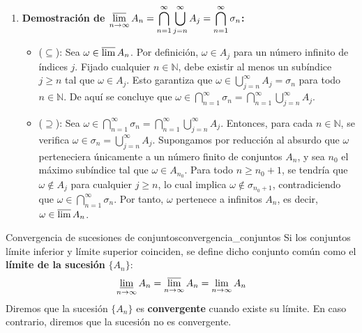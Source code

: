 \begin{demostracion}
\begin{enumerate}[label=\alph*)]
    \item \textbf{Demostración de $\displaystyle \varlimsup_{n \to \infty} A_n = \bigcap_{n=1}^\infty \bigcup_{j=n}^\infty A_j = \bigcap_{n=1}^\infty \sigma_n$:}
    \begin{itemize}
        \item ($\subseteq$): Sea $\omega \in \varlimsup A_n$. Por definición, $\omega \in A_j$ para un número infinito de índices $j$. Fijado cualquier $n \in \mathbb{N}$, debe existir al menos un subíndice $j \ge n$ tal que $\omega \in A_j$. Esto garantiza que $\omega \in \bigcup_{j=n}^\infty A_j = \sigma_n$ para todo $n \in \mathbb{N}$. De aquí se concluye que $\omega \in \bigcap_{n=1}^\infty \sigma_n = \bigcap_{n=1}^\infty \bigcup_{j=n}^\infty A_j$.
        \item ($\supseteq$): Sea $\omega \in \bigcap_{n=1}^\infty \sigma_n = \bigcap_{n=1}^\infty \bigcup_{j=n}^\infty A_j$. Entonces, para cada $n \in \mathbb{N}$, se verifica $\omega \in \sigma_n = \bigcup_{j=n}^\infty A_j$. Supongamos por reducción al absurdo que $\omega$ perteneciera únicamente a un número finito de conjuntos $A_n$, y sea $n_0$ el máximo subíndice tal que $\omega \in A_{n_0}$. Para todo $n \ge n_0 + 1$, se tendría que $\omega \notin A_j$ para cualquier $j \ge n$, lo cual implica $\omega \notin \sigma_{n_0 + 1}$, contradiciendo que $\omega \in \bigcap_{n=1}^\infty \sigma_n$. Por tanto, $\omega$ pertenece a infinitos $A_n$, es decir, $\omega \in \varlimsup A_n$.
    \end{itemize}
\end{enumerate}
\end{demostracion}

\begin{definicion}{Convergencia de sucesiones de conjuntos}{convergencia_conjuntos}
Si los conjuntos límite inferior y límite superior coinciden, se define dicho conjunto común como el \textbf{límite de la sucesión} $\{A_n\}$:
\[
    \varliminf_{n \to \infty} A_n = \varlimsup_{n \to \infty} A_n = \lim_{n \to \infty} A_n
\]
Diremos que la sucesión $\{A_n\}$ es \textbf{convergente} cuando existe su límite. En caso contrario, diremos que la sucesión no es convergente.
\end{definicion}

